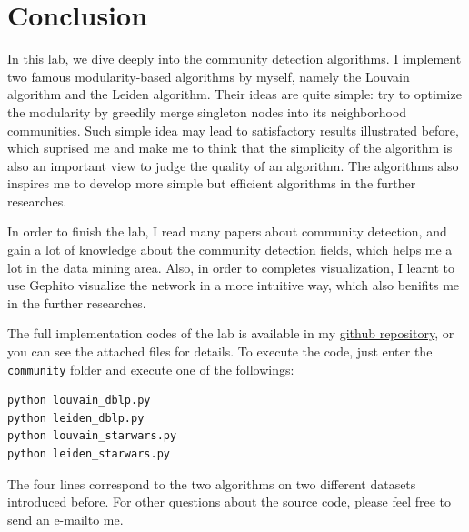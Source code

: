 \documentclass[12pt, a4paper]{article}
\theoremstyle{definition}
\begin{document}
\section{Conclusion}

In this lab, we dive deeply into the community detection algorithms. I implement two famous modularity-based algorithms by myself, namely the Louvain algorithm and the Leiden algorithm. Their ideas are quite simple: try to optimize the modularity by greedily merge singleton nodes into its neighborhood communities. Such simple idea may lead to satisfactory results illustrated before, which suprised me and make me to think that the simplicity of the algorithm is also an important view to judge the quality of an algorithm. The algorithms also inspires me to develop more simple but efficient algorithms in the further researches.

In order to finish the lab, I read many papers about community detection, and gain a lot of knowledge about the community detection fields, which helps me a lot in the data mining area. Also, in order to completes visualization, I learnt to use Gephi\footnotemark[7] to visualize the network in a more intuitive way, which also benifits me in the further researches.


The full implementation codes of the lab is available in my \href{https://github.com/Galaxies99/EE447-CourseData/tree/main/Labs/Lab3}{github repository}, or you can see the attached files for details. To execute the code, just enter the \texttt{community} folder and execute one of the followings:

\begin{lstlisting}[language=bash]
python louvain_dblp.py
python leiden_dblp.py
python louvain_starwars.py
python leiden_starwars.py
\end{lstlisting}

The four lines correspond to the two algorithms on two different datasets introduced before. For other questions about the source code, please feel free to send an e-mail\footnotemark[8] to me.

\end{document}
